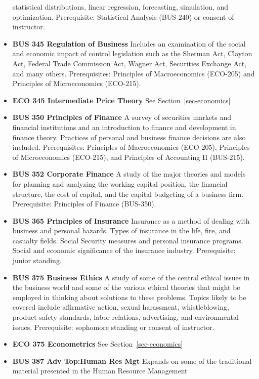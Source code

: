 \documentclass[
  letterpaper,
]{scrbook}
\begin{document}
\begin{itemize}
  statistical distributions, linear regression, forecasting, simulation,
  and optimization. Prerequisite: Statistical Analysis (BUS 240) or
  consent of instructor.
\item
  \textbf{BUS 345 Regulation of Business} Includes an examination of the
  social and economic impact of control legislation such as the Sherman
  Act, Clayton Act, Federal Trade Commission Act, Wagner Act, Securities
  Exchange Act, and many others. Prerequisites: Principles of
  Macroeconomics (ECO-205) and Principles of Microeconomics (ECO-215).
\item
  \textbf{ECO 345 Intermediate Price Theory} See
  Section~\ref{sec-economics}
\item
  \textbf{BUS 350 Principles of Finance} A survey of securities markets
  and financial institutions and an introduction to finance and
  development in finance theory. Practices of personal and business
  finance decisions are also included. Prerequisites: Principles of
  Macroeconomics (ECO-205), Principles of Microeconomics (ECO-215), and
  Principles of Accounting II (BUS-215).
\item
  \textbf{BUS 352 Corporate Finance} A study of the major theories and
  models for planning and analyzing the working capital position, the
  financial structure, the cost of capital, and the capital budgeting of
  a business firm. Prerequisite: Principles of Finance (BUS-350).
\item
  \textbf{BUS 365 Principles of Insurance} Insurance as a method of
  dealing with business and personal hazards. Types of insurance in the
  life, fire, and casualty fields. Social Security measures and personal
  insurance programs. Social and economic significance of the insurance
  industry. Prerequisite: junior standing.
\item
  \textbf{BUS 375 Business Ethics} A study of some of the central
  ethical issues in the business world and some of the various ethical
  theories that might be employed in thinking about solutions to these
  problems. Topics likely to be covered include affirmative action,
  sexual harassment, whistleblowing, product safety standards, labor
  relations, advertising, and environmental issues. Prerequisite:
  sophomore standing or consent of instructor.
\item
  \textbf{ECO 375 Econometrics} See Section~\ref{sec-economics}
\item
  \textbf{BUS 387 Adv Top:Human Res Mgt} Expands on some of the
  traditional material presented in the Human Resource Management

\end{itemize}
\end{document}
